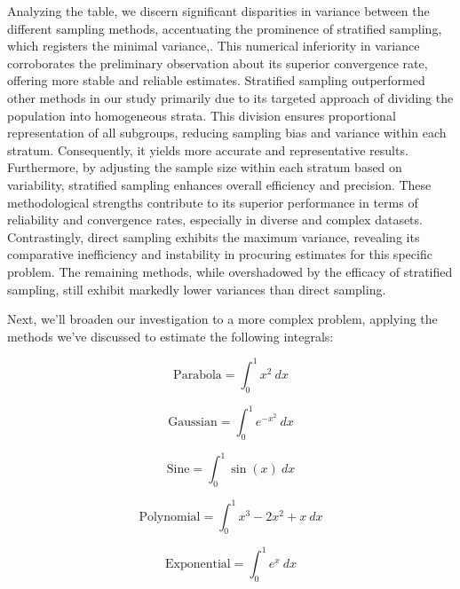 \documentclass{article}
\begin{document}
Analyzing the table, we discern significant disparities in variance between the different sampling methods, accentuating the prominence of stratified sampling, which registers the minimal variance,. This numerical inferiority in variance corroborates the preliminary observation about its superior convergence rate, offering more stable and reliable estimates. Stratified sampling outperformed other methods in our study primarily due to its targeted approach of dividing the population into homogeneous strata. This division ensures proportional representation of all subgroups, reducing sampling bias and variance within each stratum. Consequently, it yields more accurate and representative results. Furthermore, by adjusting the sample size within each stratum based on variability, stratified sampling enhances overall efficiency and precision. These methodological strengths contribute to its superior performance in terms of reliability and convergence rates, especially in diverse and complex datasets. Contrastingly, direct sampling exhibits the maximum variance, revealing its comparative inefficiency and instability in procuring estimates for this specific problem. The remaining methods, while overshadowed by the efficacy of stratified sampling, still exhibit markedly lower variances than direct sampling.

Next, we'll broaden our investigation to a more complex problem, applying the methods we’ve discussed to estimate the following integrals:

\begin{equation} 
	\label{eq:integralvariancereduction1} 
	\text{Parabola} = \int_{0}^{1} x^2 \ dx 
\end{equation}

\begin{equation} 
	\label{eq:integralvariancereduction2} 
	\text{Gaussian} = \int_{0}^{1} e^{-x^2} \ dx
\end{equation}

\begin{equation} 
	\label{eq:integralvariancereduction3} 
	\text{Sine} = \int_{0}^{1} \sin(x) \ dx
\end{equation}

\begin{equation} 
	\label{eq:integralvariancereduction4} 
	\text{Polynomial} = \int_{0}^{1} x^3 - 2x^2 + x \ dx
\end{equation}

\begin{equation} 
	\label{eq:integralvariancereduction5} 
	\text{Exponential} = \int_{0}^{1} e^x \ dx
\end{equation}
\end{document}
